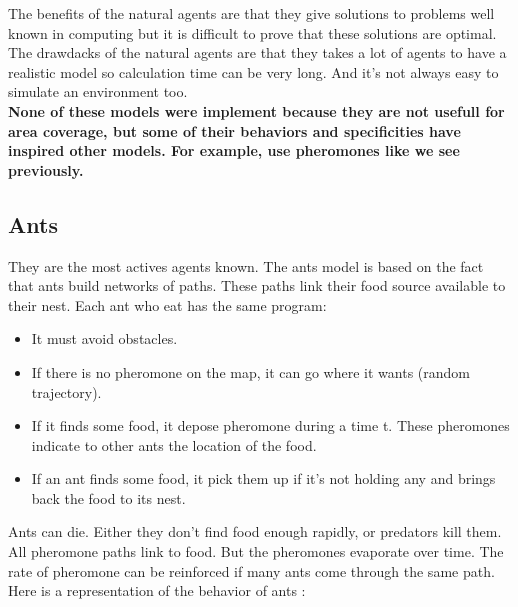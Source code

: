 The benefits of the natural agents are that they give solutions to problems well known in computing but it is difficult to prove that these solutions are optimal. The drawdacks of the natural agents are that they takes a lot of agents to have a realistic model so calculation time can be very long. And it's not always easy to simulate an environment too.\\

\textbf{None of these models were implement because they are not usefull for area coverage, but some of their behaviors and specificities have inspired other models. For example, use pheromones like we see previously.}

\subsection{Ants}

They are the most actives agents known. The ants model is based on the fact that ants build networks of paths. These paths link their food source available to their nest.
Each ant who eat has the same program:

\begin{itemize}
\item It must avoid obstacles.
\item If there is no pheromone on the map, it can go where it wants (random trajectory).
\item If it finds some food, it depose pheromone during a time t. These pheromones indicate to other ants the location of the food.
\item If an ant finds some food, it pick them up if it's not holding any and brings back the food to its nest.
\end{itemize}

Ants can die. Either they don't find food enough rapidly, or predators kill them.\\
All pheromone paths link to food. But the pheromones evaporate over time. The rate of pheromone can be reinforced if many ants come through the same path.\\
Here is a representation of the behavior of ants :

